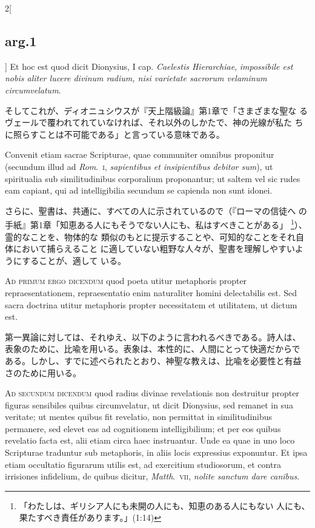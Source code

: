 \documentclass[
paper=a4paper,
fontsize=10pt,
jafontsize=9pt,
titlepage
]{jlreq}
\begin{document}
\begin{paracol}{2}[\subsection{arg.1}]
Et hoc est quod dicit Dionysius, I cap. {\itshape Caelestis
Hierarchiae}, {\itshape impossibile est nobis aliter lucere divinum
radium, nisi varietate sacrorum velaminum circumvelatum}.

\switchcolumn

そしてこれが、ディオニュシウスが『天上階級論』第1章で「さまざまな聖な
るヴェールで覆われてれていなければ、それ以外のしかたで、神の光線が私た
ちに照らすことは不可能である」と言っている意味である。

\switchcolumn*

Convenit etiam sacrae Scripturae, quae communiter omnibus proponitur
(secundum illud ad {\itshape Rom}.~{\scshape i}, {\itshape sapientibus
et insipientibus debitor sum}), ut spiritualia sub similitudinibus
corporalium proponantur; ut saltem vel sic rudes eam capiant, qui ad
intelligibilia secundum se capienda non sunt idonei.

\switchcolumn

さらに、聖書は、共通に、すべての人に示されているので（『ローマの信徒へ
の手紙』第1章「知恵ある人にもそうでない人にも、私はすべきことがある」
\footnote{「わたしは、ギリシア人にも未開の人にも、知恵のある人にもない
人にも、果たすべき責任があります。」(1:14)}）、霊的なことを、物体的な
類似のもとに提示することや、可知的なことをそれ自体において捕らえること
に適していない粗野な人々が、聖書を理解しやすいようにすることが、適して
いる。

\switchcolumn*[\subsection{ad.1}]

{\scshape Ad primum ergo dicendum} quod poeta utitur metaphoris
propter repraesentationem, repraesentatio enim naturaliter homini
delectabilis est. Sed sacra doctrina utitur metaphoris propter
necessitatem et utilitatem, ut dictum est.

\switchcolumn

第一異論に対しては、それゆえ、以下のように言われるべきである。詩人は、
表象のために、比喩を用いる。表象は、本性的に、人間にとって快適だからで
ある。しかし、すでに述べられたとおり、神聖な教えは、比喩を必要性と有益
さのために用いる。

\switchcolumn*[\subsection{ad.2}]

{\scshape Ad secundum dicendum} quod radius divinae revelationis non
destruitur propter figuras sensibiles quibus circumvelatur, ut dicit
Dionysius, sed remanet in sua veritate; ut mentes quibus fit
revelatio, non permittat in similitudinibus permanere, sed elevet eas
ad cognitionem intelligibilium; et per eos quibus revelatio facta est,
alii etiam circa haec instruantur. Unde ea quae in uno loco Scripturae
traduntur sub metaphoris, in aliis locis expressius exponuntur. Et
ipsa etiam occultatio figurarum utilis est, ad exercitium studiosorum,
et contra irrisiones infidelium, de quibus dicitur, {\itshape
Matth}.~{\scshape vii}, {\itshape nolite sanctum dare canibus}.


\end{paracol}
\end{document}
